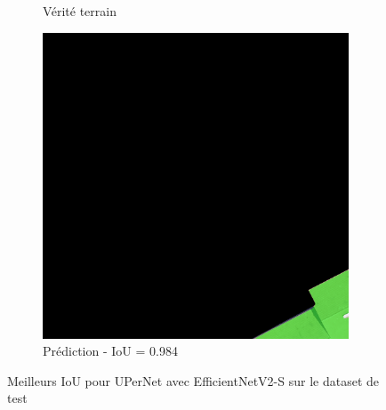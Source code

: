 \begin{figure}[H]
\begin{subfigure}{0.32\textwidth}
    \caption{Vérité terrain}
\end{subfigure}
\hfill
\begin{subfigure}{0.32\textwidth}
    \includegraphics[width=\textwidth]{02-main//figures/ch4/kfold_ensembles/upernet_tu-efficientnetv2_rw_s.ra2_in1k/best_cases/best_2_iou0.984_24931113_tile_13_18_a66e08_overlay_pred.png}
    \caption{Prédiction - IoU = 0.984}
\end{subfigure}

\caption{Meilleurs IoU pour UPerNet avec EfficientNetV2-S sur le dataset de test}
\label{fig:upernet_efficientnetv2_s_best_cases}
\end{figure}


